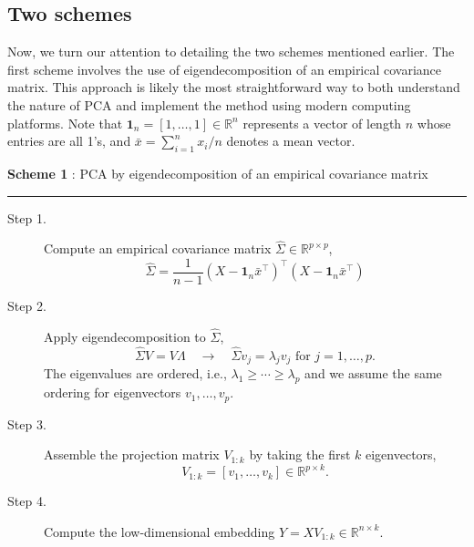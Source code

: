 \documentclass[11pt]{article}
\newcommand{\bbR}{\mathbb{R}}
\newcommand{\bfone}{\mathbf{1}}
\begin{document}
\subsection{Two schemes}


Now, we turn our attention to detailing the two schemes mentioned earlier. The first scheme involves the use of eigendecomposition of an empirical covariance matrix. This approach is likely the most straightforward way to both understand the nature of PCA and implement the method using modern computing platforms. Note that $\bfone_n = [1,\ldots, 1] \in \mathbb{R}^n$ represents a vector of length $n$ whose entries are all 1's, and $\bar{x} = \sum_{i=1}^n x_i / n$ denotes a mean vector.



\vspace{0.25cm}
\begin{tcolorbox}
	\begin{center}
		\textbf{Scheme 1} : PCA by eigendecomposition of an empirical covariance matrix
	\end{center}
	\vspace{-.15cm}
	\hrule
	\begin{description}
		\item[Step 1.] Compute an empirical covariance matrix $\hat{\Sigma} \in \bbR^{p\times p}$,
		\begin{equation*}
			\hat{\Sigma} = \frac{1}{n-1}(X - \bfone_n \bar{x}^\top)^\top(X - \bfone_n \bar{x}^\top)
		\end{equation*}
		\item[Step 2.] Apply eigendecomposition to $\hat{\Sigma}$,
		\begin{equation*}
			\hat{\Sigma} V = V \Lambda \quad \longrightarrow \quad  \hat{\Sigma} v_j = \lambda_j v_j\text{ for }j=1,\ldots, p.
		\end{equation*}
		The eigenvalues are ordered, i.e., $\lambda_1 \geq \cdots \geq \lambda_p$ and we assume the same ordering for eigenvectors $v_1, \ldots, v_p$. 
		\item[Step 3.] Assemble the projection matrix $V_{1:k}$ by taking the first $k$ eigenvectors,
		\begin{equation*}
			V_{1:k} = [v_1, \ldots, v_k] \in \bbR^{p\times k}.
		\end{equation*}
		\item[Step 4.] Compute the low-dimensional embedding $Y = X V_{1:k} \in \mathbb{R}^{n\times k}$. 
	\end{description}
\end{tcolorbox}
\end{document}

